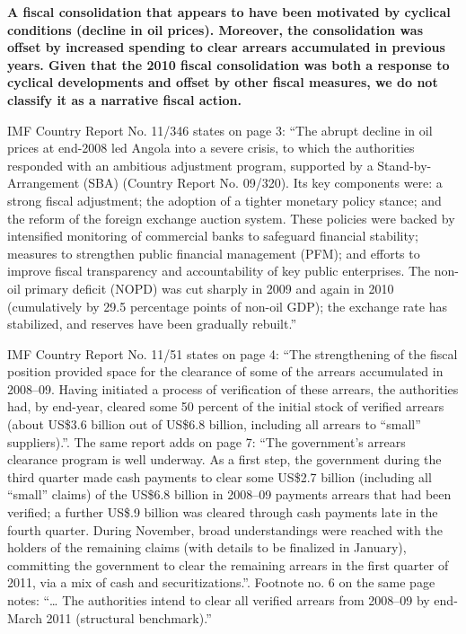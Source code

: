 \textbf{A fiscal consolidation that appears to have been motivated by cyclical conditions (decline in oil prices). Moreover, the consolidation was offset by increased spending to clear arrears accumulated in previous years. Given that the 2010 fiscal consolidation was both a response to cyclical developments and offset by other fiscal measures, we do not classify it as a narrative fiscal action.}

IMF Country Report No. 11/346 states on page 3: “The abrupt decline in oil prices at end-2008 led Angola into a severe crisis, to which the authorities responded with an ambitious adjustment program, supported by a Stand-by-Arrangement (SBA) (Country Report No. 09/320). Its key components were: a strong fiscal adjustment; the adoption of a tighter monetary policy stance; and the reform of the foreign exchange auction system. These policies were backed by intensified monitoring of commercial banks to safeguard financial stability; measures to strengthen public financial management (PFM); and efforts to improve fiscal transparency and accountability of key public enterprises. The non-oil primary deficit (NOPD) was cut sharply in 2009 and again in 2010 (cumulatively by 29.5 percentage points of non-oil GDP); the exchange rate has stabilized, and reserves have been gradually rebuilt.”

IMF Country Report No. 11/51 states on page 4: “The strengthening of the fiscal position provided space for the clearance of some of the arrears accumulated in 2008–09. Having initiated a process of verification of these arrears, the authorities had, by end-year, cleared some 50 percent of the initial stock of verified arrears (about US\$3.6 billion out of US\$6.8 billion, including all arrears to “small” suppliers).”. The same report adds on page 7: “The government’s arrears clearance program is well underway. As a first step, the government during the third quarter made cash payments to clear some US\$2.7 billion (including all “small” claims) of the US\$6.8 billion in 2008–09 payments arrears that had been verified; a further US\$.9 billion was cleared through cash payments late in the fourth quarter. During November, broad understandings were reached with the holders of the remaining claims (with details to be finalized in January), committing the government to clear the remaining arrears in the first quarter of 2011, via a mix of cash and securitizations.”. Footnote no. 6 on the same page notes: “… The authorities intend to clear all verified arrears from 2008–09 by end-March 2011 (structural benchmark).”

